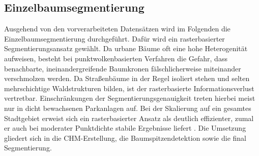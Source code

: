 \subsection{Einzelbaumsegmentierung}

Ausgehend von den vorverarbeiteten Datensätzen wird im Folgenden die Einzelbaumsegmentierung durchgeführt. Dafür wird ein rasterbasierter Segmentierungsansatz gewählt. Da urbane Bäume oft eine hohe Heterogenität aufweisen, besteht bei punktwolkenbasierten Verfahren die Gefahr, dass benachbarte, ineinandergreifende Baumkronen fälschlicherweise miteinander verschmolzen werden. Da Straßenbäume in der Regel isoliert stehen und selten mehrschichtige Waldstrukturen bilden, ist der rasterbasierte Informationsverlust vertretbar. Einschränkungen der Segmentierungsgenauigkeit treten hierbei meist nur in dicht bewachsenen Parkanlagen auf. Bei der Skalierung auf ein gesamtes Stadtgebiet erweist sich ein rasterbasierter Ansatz als deutlich effizienter, zumal er auch bei moderater Punktdichte stabile Ergebnisse liefert \cite{munzingerMappingUrbanForest2022}. Die Umsetzung gliedert sich in die CHM-Erstellung, die Baumspitzendetektion sowie die final Segmentierung.